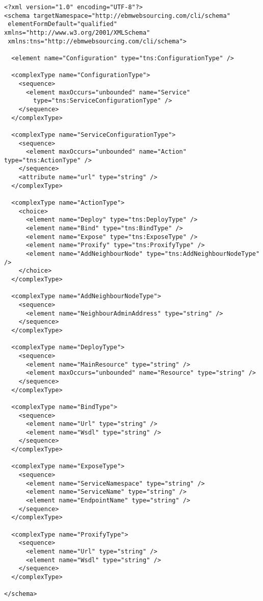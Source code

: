\documentclass[a4paper, 10pt]{article}
\begin{document}
{\footnotesize
\begin{lstlisting}[caption=\texttt{config.xml} schema, label=lst:config_xml_schema]
<?xml version="1.0" encoding="UTF-8"?>
<schema targetNamespace="http://ebmwebsourcing.com/cli/schema"
 elementFormDefault="qualified" xmlns="http://www.w3.org/2001/XMLSchema"
 xmlns:tns="http://ebmwebsourcing.com/cli/schema">

  <element name="Configuration" type="tns:ConfigurationType" />

  <complexType name="ConfigurationType">
    <sequence>
      <element maxOccurs="unbounded" name="Service"
        type="tns:ServiceConfigurationType" />
    </sequence>
  </complexType>

  <complexType name="ServiceConfigurationType">
    <sequence>
      <element maxOccurs="unbounded" name="Action" type="tns:ActionType" />
    </sequence>
    <attribute name="url" type="string" />
  </complexType>

  <complexType name="ActionType">
    <choice>
      <element name="Deploy" type="tns:DeployType" />
      <element name="Bind" type="tns:BindType" />
      <element name="Expose" type="tns:ExposeType" />
      <element name="Proxify" type="tns:ProxifyType" />
      <element name="AddNeighbourNode" type="tns:AddNeighbourNodeType" />
    </choice>
  </complexType>

  <complexType name="AddNeighbourNodeType">
    <sequence>
      <element name="NeighbourAdminAddress" type="string" />
    </sequence>
  </complexType>

  <complexType name="DeployType">
    <sequence>
      <element name="MainResource" type="string" />
      <element maxOccurs="unbounded" name="Resource" type="string" />
    </sequence>
  </complexType>

  <complexType name="BindType">
    <sequence>
      <element name="Url" type="string" />
      <element name="Wsdl" type="string" />
    </sequence>
  </complexType>

  <complexType name="ExposeType">
    <sequence>
      <element name="ServiceNamespace" type="string" />
      <element name="ServiceName" type="string" />
      <element name="EndpointName" type="string" />
    </sequence>
  </complexType>

  <complexType name="ProxifyType">
    <sequence>
      <element name="Url" type="string" />
      <element name="Wsdl" type="string" />
    </sequence>
  </complexType>

</schema>
\end{lstlisting}
}
\end{document}
